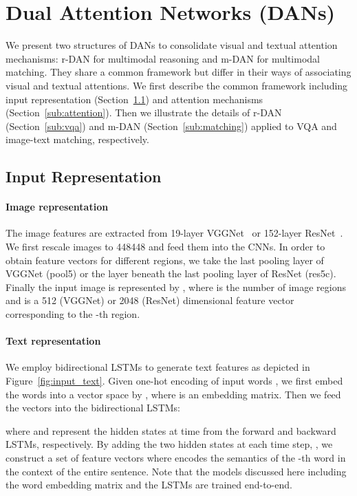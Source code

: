 \documentclass[10pt,twocolumn,letterpaper]{article}
\begin{document}
\section{Dual Attention Networks (DANs)}
We present two structures of DANs to consolidate visual and textual attention mechanisms: r-DAN for multimodal reasoning and m-DAN for multimodal matching.
They share a common framework but differ in their ways of associating visual and textual attentions.
We first describe the common framework including input representation (Section~\ref{sub:input}) and attention mechanisms (Section~\ref{sub:attention}).
Then we illustrate the details of r-DAN (Section~\ref{sub:vqa}) and m-DAN (Section~\ref{sub:matching}) applied to VQA and image-text matching, respectively.



\subsection{Input Representation}
\label{sub:input}

\paragraph{Image representation}
The image features are extracted from 19-layer VGGNet~\cite{simonyan2014very} or 152-layer ResNet~\cite{he2016deep}.
We first rescale images to 448448 and feed them into the CNNs.
In order to obtain feature vectors for different regions, we take the last pooling layer of VGGNet (pool5) or the layer beneath the last pooling layer of ResNet (res5c).
Finally the input image is represented by , where  is the number of image regions and  is a 512 (VGGNet) or 2048 (ResNet) dimensional feature vector corresponding to the -th region.

\paragraph{Text representation}
We employ bidirectional LSTMs to generate text features as depicted in Figure~\ref{fig:input_text}.
Given one-hot encoding of  input words , we first embed the words into a vector space by , where  is an embedding matrix.
Then we feed the vectors into the bidirectional LSTMs:

where  and  represent the hidden states at time  from the forward and backward LSTMs, respectively.
By adding the two hidden states at each time step, \ie , we construct a set of feature vectors  where  encodes the semantics of the -th word in the context of the entire sentence.
Note that the models discussed here including the word embedding matrix and the LSTMs are trained end-to-end.
\end{document}

